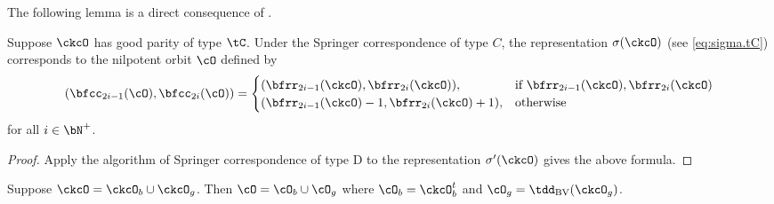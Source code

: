 \documentclass[counting_main.tex]{subfiles}
\begin{document}
The following lemma is a direct consequence of .
\begin{lem}
  Suppose $\ckcO$ has good parity of type $\tC$. Under the Springer
  correspondence of type $C$, the representation $\sigma(\ckcO)$ (see
  \eqref{eq:sigma.tC}) corresponds to the nilpotent orbit $\cO$ defined by
  \[
    (\bfcc_{2i-1}(\cO),\bfcc_{2i}(\cO)) =\begin{cases}
      (\bfrr_{2i-1}(\ckcO),\bfrr_{2i}(\ckcO)), & \text{if } \bfrr_{2i-1}(\ckcO),\bfrr_{2i}(\ckcO)\\
      (\bfrr_{2i-1}(\ckcO)-1,\bfrr_{2i}(\ckcO)+1), & \text{otherwise} \\
    \end{cases}
  \]
  for all $i\in \bN^+$.
\end{lem}
\begin{proof}
  Apply the algorithm of Springer correspondence of type D to the representation $\sigma'(\ckcO)$ gives the above formula.
\end{proof}



\def\tdBV{\tdd_{\text{BV}}}
\begin{lem}
Suppose $\ckcO = \ckcO_{b}\cup \ckcO_{g}$.
Then $\cO = \cO_{b} \cup \cO_{g}$ where $\cO_{b} = \ckcO_{b}^{t}$ and
$\cO_{g}=\tdBV(\ckcO_{g})$.
\end{lem}

\end{document}
